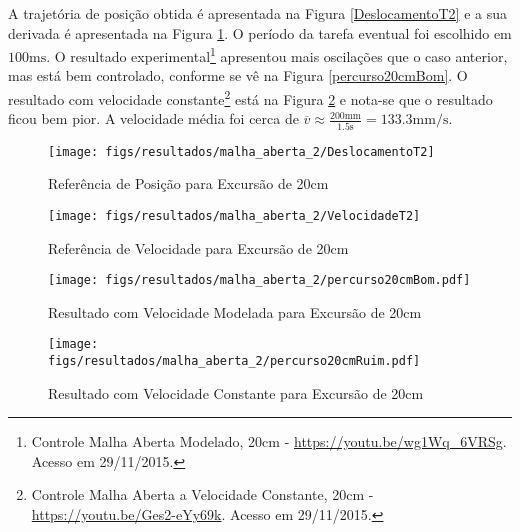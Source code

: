 A trajetória de posição obtida é apresentada na Figura \ref{DeslocamentoT2} e a sua derivada é apresentada na Figura \ref{VelocidadeT2}. O período da tarefa eventual foi escolhido em $100\mathrm{ms}$. O resultado experimental\footnote{Controle Malha Aberta Modelado, 20cm - \url{https://youtu.be/wg1Wq_6VRSg}. Acesso em 29/11/2015.} apresentou mais oscilações que o caso anterior, mas está bem controlado, conforme se vê na Figura \ref{percurso20cmBom}. O resultado com velocidade constante\footnote{Controle Malha Aberta a Velocidade Constante, 20cm - \url{https://youtu.be/Ges2-eYy69k}. Acesso em 29/11/2015.} está na Figura \ref{percurso20cmRuim} e nota-se que o resultado ficou bem pior. A velocidade média foi cerca de $\overline{v} \approx \frac{200\mathrm{mm}}{1.5\mathrm{s}} = 133.3\mathrm{mm}/\mathrm{s}$. %

\begin{figure}[!htb]
    \centering
    \begin{minipage}{.45\textwidth}
        \centering
        \texttt{[image: figs/resultados/malha\_aberta\_2/DeslocamentoT2]}
        \caption{Referência de Posição para Excursão de 20cm}
        \label{DeslocamentoT2}
    \end{minipage}%
    \hspace{0.1cm}
    \begin{minipage}{0.45\textwidth}
        \centering
        \texttt{[image: figs/resultados/malha\_aberta\_2/VelocidadeT2]}
        \caption{Referência de Velocidade para Excursão de 20cm}
        \label{VelocidadeT2}
    \end{minipage}
\end{figure}

\begin{figure}[!htb]
    \centering
    \begin{minipage}{.45\textwidth}
        \centering
        \texttt{[image: figs/resultados/malha\_aberta\_2/percurso20cmBom.pdf]}
        \caption{Resultado com Velocidade Modelada para Excursão de 20cm}
        \label{percurso20cmBom}
    \end{minipage}%
    \hspace{0.1cm}
    \begin{minipage}{0.45\textwidth}
        \centering
        \texttt{[image: figs/resultados/malha\_aberta\_2/percurso20cmRuim.pdf]}
        \caption{Resultado com Velocidade Constante para Excursão de 20cm}
        \label{percurso20cmRuim}
    \end{minipage}
\end{figure}






